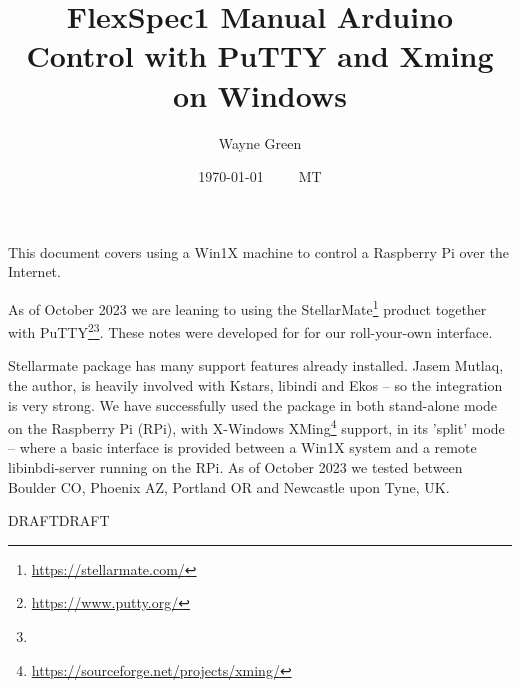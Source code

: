 \documentclass[letter,11pt,oneside]{article}
\def\documentisdraft{DRAFT}
\def\drafttest{DRAFT}
\newcommand{\dhl}[1]{{\color{verbcolor}{\texttt#1}}}
\begin{document}


\title{FlexSpec1 Manual Arduino Control with PuTTY and Xming on Windows}
\author{Wayne Green}
\date{\today ~ ~ \currenttime~ MT}
\maketitle

This document covers using a Win1X machine to control a Raspberry Pi
over the Internet.

As of October 2023 we are leaning to using the
StellarMate\footnote{\url{https://stellarmate.com/}} product together
with PuTTY\footnote{\url{https://www.putty.org/}}\footnote{\dhl{sudo
    apt install putty -y}}. These notes were developed for for our
roll-your-own interface.

Stellarmate package has many support features already installed. Jasem
Mutlaq, the author, is heavily involved with Kstars, libindi and Ekos
-- so the integration is very strong. We have successfully used the
package in both stand-alone mode on the Raspberry Pi (RPi), with
X-Windows
XMing\footnote{\url{https://sourceforge.net/projects/xming/}} support,
in its 'split' mode -- where a basic interface is provided between a
Win1X system and a remote libinbdi-server running on the RPi. As of
October 2023 we tested between Boulder CO, Phoenix AZ, Portland OR and
Newcastle upon Tyne, UK.




 
\tableofcontents
\listoffigures
\newpage


\setcounter{section}{0}


\ifx\documentisdraft\drafttest
\linenumbers    %
\fi






\end{document}
